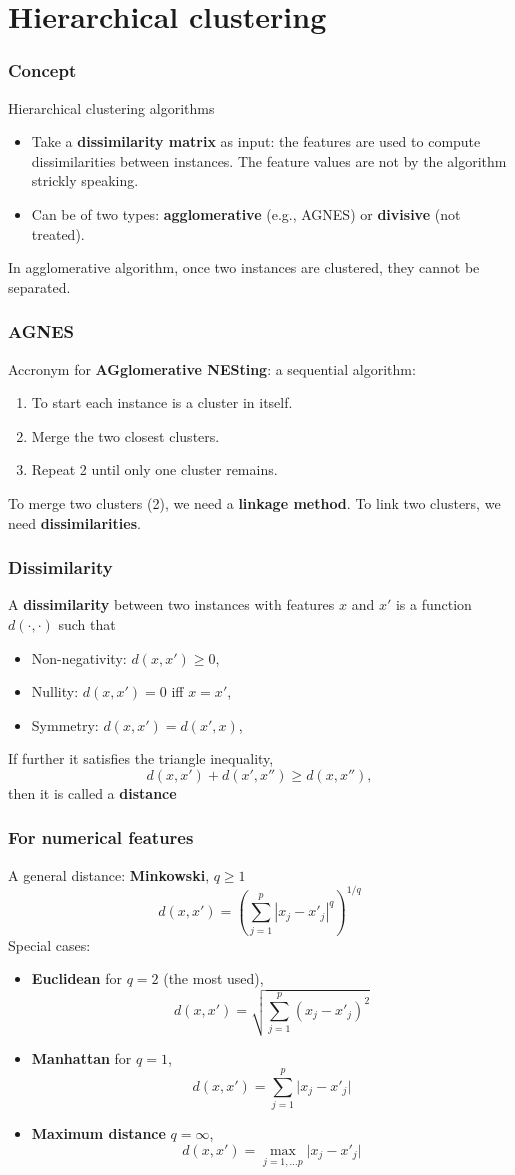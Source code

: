 \section{Hierarchical clustering}
\begin{frame}
\frametitle{Concept}
Hierarchical clustering algorithms
\begin{itemize}
\item Take a {\bf dissimilarity matrix} as input: the features are used to compute dissimilarities between instances. The feature values are not by the algorithm strickly speaking.  
\item Can be of two types: {\bf agglomerative} (e.g., AGNES) or {\bf divisive} (not treated). 
\end{itemize}
In agglomerative algorithm, once two instances are clustered, they cannot be separated.
\end{frame}
\begin{frame}
\frametitle{AGNES}
Accronym for {\bf AGglomerative NESting}: a sequential algorithm: 
\begin{enumerate}
\item To start each instance is a cluster in itself. 
\item Merge the two closest clusters.
\item Repeat 2 until only one cluster remains.
\end{enumerate}
To merge two clusters (2), we need a {\bf linkage method}. To link two clusters, we need {\bf dissimilarities}.
\end{frame}
\begin{frame}
\frametitle{Dissimilarity}
A {\bf dissimilarity} between two instances with features $x$ and $x'$ is a function $d(\cdot, \cdot)$ such that
\begin{itemize}
\item Non-negativity: $d(x,x')\geq 0$,
\item Nullity: $d(x,x') = 0$ iff $x=x'$,
\item Symmetry: $d(x,x') = d(x',x)$,
\end{itemize}
If further it satisfies the triangle inequality, 
$$
d(x, x') + d(x', x'') \geq d(x, x''),
$$
then it is called a {\bf distance}
\end{frame}
\begin{frame}
\frametitle{For numerical features}
A general distance: {\bf Minkowski}, $q \geq 1$
$$
d(x,x') = \left(\sum_{j=1}^p |x_j - x'_j|^q\right)^{1/q}
$$
\scriptsize
Special cases:
\begin{itemize}
\item {\bf Euclidean} for $q=2$ (the most used),
$$
d(x,x') = \sqrt{\sum_{j=1}^p (x_{j} - x'_{j})^2}
$$
\item {\bf Manhattan} for $q=1$, 
$$
d(x,x') = \sum_{j=1}^p \vert x_j - x'_j \vert
$$
\item {\bf Maximum distance} $q=\infty$, 
$$
d(x,x') = \max_{j=1,\ldots p} \vert x_j - x'_j\vert
$$
\end{itemize}
\normalsize
\end{frame}
